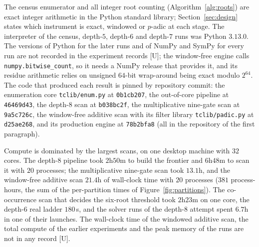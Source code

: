 \documentclass[11pt]{article}
\theoremstyle{definition}
\theoremstyle{remark}
\begin{document}
The census enumerator and all integer root counting (Algorithm~\ref{alg:roots}) are exact integer
arithmetic in the Python standard library; Section~\ref{sec:design} states which instrument is
exact, windowed or $p$-adic at each stage.
The interpreter of the census, depth-$5$, depth-$6$ and depth-$7$ runs was Python $3.13.0$.
The versions of Python for the later runs and of NumPy and SymPy for every run are not
recorded in the experiment records [U]; the window-free engine calls
\texttt{numpy.bitwise\_count}, so it needs a NumPy release that provides it, and its
residue arithmetic relies on unsigned $64$-bit wrap-around being exact modulo $2^{64}$. The
code that produced each result is pinned by repository commit: the enumeration core
\texttt{tclib/enum.py} at \texttt{0b1cb207}, the out-of-core pipeline at \texttt{46469d43},
the depth-$8$ scan at \texttt{b038bc2f}, the multiplicative nine-gate scan at
\texttt{9a5c726c}, the window-free additive scan with its filter library
\texttt{tclib/padic.py} at \texttt{d25ae268}, and its production engine at
\texttt{78b2bfa8} (all in the repository of the first paragraph).

Compute is dominated by the largest scans, on one desktop machine with $32$ cores. The depth-$8$ pipeline
took $2$h$50$m to build the frontier and $6$h$48$m to scan it with $20$ processes; the multiplicative
nine-gate scan took $13.1$h, and the window-free additive scan $21.4$h of wall-clock time with $20$
processes ($381$ process-hours, the sum of the per-partition times of Figure~\ref{fig:partitions}). The
co-occurrence scan that decides the six-root threshold took $2$h$23$m on one core, the depth-$6$ real
ladder $180$\,s, and the solver runs of the depth-$8$ attempt spent $6.7$h in one of their launches. The
wall-clock time of the windowed additive scan, the total compute of the earlier experiments and the peak
memory of the runs are not in any record [U].
\end{document}
